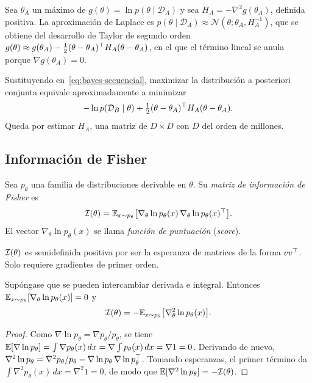 \begin{definicion}\label{def:laplace}
Sea $\theta_A$ un máximo de $g(\theta)=\ln p(\theta\mid\mathcal{D}_A)$ y sea $H_A=-\nabla^{2}g(\theta_A)$, definida positiva. La aproximación de Laplace es $p(\theta\mid\mathcal{D}_A)\approx\mathcal{N}(\theta;\theta_A,H_A^{-1})$, que se obtiene del desarrollo de Taylor de segundo orden $g(\theta)\approx g(\theta_A)-\frac12(\theta-\theta_A)^{\top} H_A(\theta-\theta_A)$, en el que el término lineal se anula porque $\nabla g(\theta_A)=0$.
\end{definicion}

Sustituyendo en~\eqref{eq:bayes-secuencial}, maximizar la distribución a posteriori conjunta equivale aproximadamente a minimizar
\[
-\ln p(\mathcal{D}_B\mid\theta)+\tfrac12(\theta-\theta_A)^{\top} H_A(\theta-\theta_A).
\]
Queda por estimar $H_A$, una matriz de $D\times D$ con $D$ del orden de millones.

\subsection{Información de Fisher}

\begin{definicion}\label{def:fisher}
Sea $p_\theta$ una familia de distribuciones derivable en $\theta$. Su \emph{matriz de información de Fisher} es
\[
\mathcal{I}(\theta)=\mathbb{E}_{x\sim p_\theta}\bigl[\nabla_\theta\ln p_\theta(x)\,\nabla_\theta\ln p_\theta(x)^{\top}\bigr].
\]
El vector $\nabla_\theta\ln p_\theta(x)$ se llama \emph{función de puntuación} (\emph{score}).
\end{definicion}

$\mathcal{I}(\theta)$ es semidefinida positiva por ser la esperanza de matrices de la forma $vv^{\top}$. Solo requiere gradientes de primer orden.

\begin{proposicion}\label{prop:fisher-hess}
Supóngase que se pueden intercambiar derivada e integral. Entonces $\mathbb{E}_{x\sim p_\theta}[\nabla_\theta\ln p_\theta(x)]=0$ y
\[
\mathcal{I}(\theta)=-\mathbb{E}_{x\sim p_\theta}\bigl[\nabla^{2}_\theta\ln p_\theta(x)\bigr].
\]
\end{proposicion}

\begin{proof}
Como $\nabla\ln p_\theta=\nabla p_\theta/p_\theta$, se tiene $\mathbb{E}[\nabla\ln p_\theta]=\int\nabla p_\theta(x)\,dx=\nabla\int p_\theta(x)\,dx=\nabla 1=0$. Derivando de nuevo, $\nabla^{2}\ln p_\theta=\nabla^{2}p_\theta/p_\theta-\nabla\ln p_\theta\,\nabla\ln p_\theta^{\top}$. Tomando esperanzas, el primer término da $\int\nabla^{2}p_\theta(x)\,dx=\nabla^{2}1=0$, de modo que $\mathbb{E}[\nabla^{2}\ln p_\theta]=-\mathcal{I}(\theta)$.
\end{proof}

